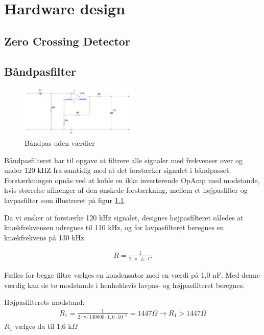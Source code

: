 \chapter{Hardware design}

\section{Zero Crossing Detector}

\newpage

\section{Båndpasfilter}
\begin{figure}[htbp]
	\centering
	\includegraphics[width=0.50\textwidth]{billeder/HWdesign/BAANDPAS_UV.png}
	\caption{Båndpas uden værdier}
	\label{fig:BAANDPAS_UV}
\end{figure}

Båndpasfilteret har til opgave at filtrere alle signaler med frekvenser over og under 120 kHZ fra samtidig med at det forstærker signalet i båndpasset. Forstærkningen opnås ved at koble en ikke inverterende OpAmp med modstande, hvis størrelse afhænger af den ønskede forstærkning, mellem et højpasfilter og lavpasfilter som illustreret på figur \ref{fig:BAANDPAS_UV}.

Da vi ønsker at forstærke 120 kHz signalet, designes højpasfilteret således at knækfrekvensen udregnes til 110 kHz, og for lavpasfilteret beregnes en knækfrekvens på 130 kHz. 

\begin{align}
R = \frac{1}{2 \cdot \pi \cdot f_c \cdot C } 
\end{align}

Fælles for begge filtre vælges en kondensator med en værdi på 1,0 nF. Med denne værdig kan de to modstande i henholdsvis lavpas- og højpasfilteret beregnes.

Højpasfilterets modstand:
\begin{align}
R_1 = \frac{1}{2 \cdot \pi \cdot 130000 \cdot 1,0 \cdot 10^{-9}} = 1447 \Omega
\rightarrow R_1 > 1447 \Omega
\end{align}
$R_1$ vælges da til 1,6 k$\Omega$


